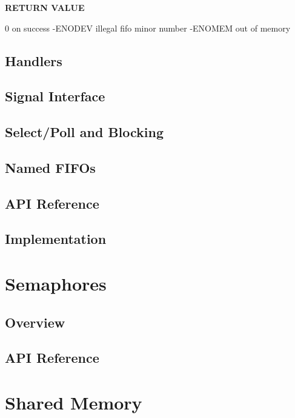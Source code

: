 \textbf{RETURN VALUE}

	0 on success
	-ENODEV illegal fifo minor number 
	-ENOMEM out of memory


\subsection{Handlers}

\subsection{Signal Interface}

\subsection{Select/Poll and Blocking}

\subsection{Named FIFOs}

\subsection{API Reference}



\subsection{Implementation}


\section{Semaphores}

\subsection{Overview}

\subsection{API Reference}


\section{Shared Memory}

